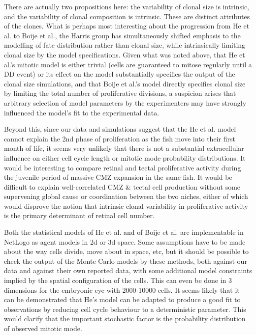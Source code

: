 \bigskip

There are actually two propositions here: the variability of clonal size is intrinsic, and the variability of clonal composition is intrinsic. These are distinct attributes of the clones. What is perhaps most interesting about the progression from He et al. to Boije et al., the Harris group has simultaneously shifted emphasis to the modelling of fate distribution rather than clonal size, while intrinsically limiting clonal size by the model specifications. Given what was noted above, that He et al.'s mitotic model is either trivial (cells are guaranteed to mitose regularly until a DD event) or its effect on the model substantially specifies the output of the clonal size simulations, and that Boije et al.'s model directly specifies clonal size by limiting the total number of proliferative divisions, a suspicion arises that arbitrary selection of model parameters by the experimenters may have strongly influenced the model's fit to the experimental data. 

Beyond this, since our data and simulations suggest that the He et al. model cannot explain the 2nd phase of proliferation as the fish move into their first month of life, it seems very unlikely that there is not a substantial extracellular influence on either cell cycle length or mitotic mode probability distributions. It would be interesting to compare retinal and tectal proliferative activity during the juvenile period of massive CMZ expansion in the same fish. It would be difficult to explain well-correlated CMZ \& tectal cell production without some supervening global cause or coordination between the two niches, either of which would disprove the notion that intrinsic clonal variability in proliferative activity is the primary determinant of retinal cell number.

Both the statistical models of He et al. and of Boije et al. are implementable in NetLogo as agent models in 2d or 3d space. Some assumptions have to be made about the way cells divide, move about in space, etc, but it should be possible to check the output of the Monte Carlo models by these methods, both against our data and against their own reported data, with some additional model constraints implied by the spatial configuration of the cells. This can even be done in 3 dimensions for the embryonic eye with 2000-10000 cells. It seems likely that it can be demonstrated that He's model can be adapted to produce a good fit to observations by reducing cell cycle behaviour to a deterministic parameter. This would clarify that the important stochastic factor is the probability distribution of observed mitotic mode. 

